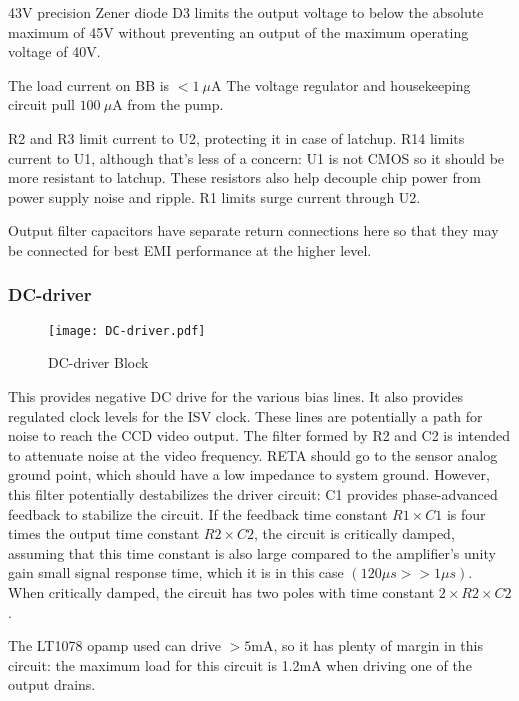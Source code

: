 43V precision Zener diode D3 limits the output voltage to below the absolute maximum of 45V without preventing an output of the maximum operating voltage of 40V.

The load current on BB is $<1\ \mu$A The voltage regulator and housekeeping circuit pull $100\ \mu$A from the pump.

R2 and R3 limit current to U2, protecting it in case of latchup. R14 limits current to U1, although that's less of a concern: U1 is not CMOS so it should be more resistant to latchup. These resistors also help decouple chip power from power supply noise and ripple. R1 limits surge current through U2.

Output filter capacitors have separate return connections here so that they may be connected for best EMI performance at the higher level.




\subsubsection{DC-driver}
   \begin{figure}
   \begin{center}
   \texttt{[image: DC-driver.pdf]}
   \end{center}
   \caption{DC-driver Block}
   \end{figure}

This provides negative DC drive for the various bias lines. It also provides regulated clock levels for the ISV clock. These lines are potentially a path for noise to reach the CCD video output. The filter formed by R2 and C2 is intended to attenuate noise at the video frequency. RETA should go to the sensor analog ground point, which should have a low impedance to system ground.
However, this filter potentially destabilizes the driver circuit: C1 provides phase-advanced feedback to stabilize the circuit. If the feedback time constant $R1\times C1$ is four times the output time constant $R2\times C2$, the circuit is critically damped, assuming that this time constant is also large compared to the amplifier's unity gain small signal response time, which it is in this case $(120\mu s>>1 \mu s)$. When critically damped, the circuit has two poles with time constant $2\times R2\times C2$.

The LT1078 opamp used can drive $>5$mA, so it has plenty of margin in this circuit: the maximum load for this circuit is 1.2mA when driving one of the output drains. 

